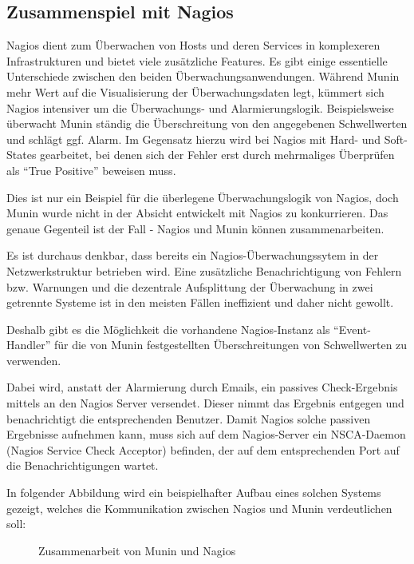 \subsection{Zusammenspiel mit Nagios}

Nagios dient zum Überwachen von Hosts und deren Services in komplexeren Infrastrukturen und bietet viele zusätzliche Features.
Es gibt einige essentielle Unterschiede zwischen den beiden Überwachungsanwendungen.
Während Munin mehr Wert auf die Visualisierung der Überwachungsdaten legt, kümmert sich Nagios intensiver um die Überwachungs- und Alarmierungslogik.
Beispielsweise überwacht Munin ständig die Überschreitung von den angegebenen Schwellwerten und schlägt ggf. Alarm.
Im Gegensatz hierzu wird bei Nagios mit Hard- und Soft-States gearbeitet, bei denen sich der Fehler erst durch mehrmaliges Überprüfen als "`True Positive"' beweisen muss.

Dies ist nur ein Beispiel für die überlegene Überwachungslogik von Nagios, doch Munin wurde nicht in der Absicht entwickelt mit Nagios zu konkurrieren.
Das genaue Gegenteil ist der Fall - Nagios und Munin können zusammenarbeiten.

Es ist durchaus denkbar, dass bereits ein Nagios-Überwachungssytem in der Netzwerkstruktur betrieben wird.
Eine zusätzliche Benachrichtigung von Fehlern bzw. Warnungen und die dezentrale Aufsplittung der Überwachung in zwei getrennte Systeme ist in den meisten Fällen ineffizient und daher nicht gewollt.

Deshalb gibt es die Möglichkeit die vorhandene Nagios-Instanz als "`Event-Handler"' für die von Munin festgestellten Überschreitungen von Schwellwerten zu verwenden.

Dabei wird, anstatt der Alarmierung durch Emails, ein passives Check-Ergebnis mittels  an den Nagios Server versendet.
Dieser nimmt das Ergebnis entgegen und benachrichtigt die entsprechenden Benutzer.
Damit Nagios solche passiven Ergebnisse aufnehmen kann, muss sich auf dem Nagios-Server ein NSCA-Daemon (Nagios Service Check Acceptor) befinden, der auf dem entsprechenden Port auf die Benachrichtigungen wartet.

In folgender Abbildung wird ein beispielhafter Aufbau eines solchen Systems gezeigt, welches die Kommunikation zwischen Nagios und Munin verdeutlichen soll:

\begin{figure}[ht]
	\centering
		\caption{Zusammenarbeit von Munin und Nagios}
		\label{nsca}
\end{figure}

